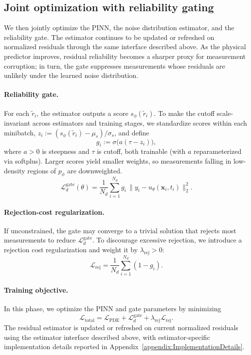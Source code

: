 \documentclass{article}
\theoremstyle{plain}
\theoremstyle{definition}
\theoremstyle{remark}
\begin{document}
\subsection{Joint optimization with reliability gating}
\label{subsec:stage2}
We then jointly optimize the PINN, the noise distribution estimator, and the reliability gate. The estimator continues to be updated or refreshed on normalized residuals through the same interface described above. As the physical predictor improves, residual reliability becomes a sharper proxy for measurement corruption; in turn, the gate suppresses measurements whose residuals are unlikely under the learned noise distribution.

\paragraph{Reliability gate.}
For each $\tilde r_i$, the estimator outputs a score $s_\phi(\tilde r_i)$. To make the cutoff scale-invariant across estimators and training stages, we standardize scores within each minibatch, $z_i := (s_\phi(\tilde r_i) - \mu_s)/\sigma_s$, and define
\begin{equation}
g_i := \sigma\!\big(a(\tau - z_i)\big),
\label{eq:gate}
\end{equation}
where $a > 0$ is steepness and $\tau$ is cutoff, both trainable (with $a$ reparameterized via softplus). Larger scores yield smaller weights, so measurements falling in low-density regions of $p_\phi$ are downweighted.
\begin{equation}
\mathcal{L}_{d}^{\text{gate}}(\theta)
= \frac{1}{N_d}\sum_{i=1}^{N_d} g_i \, \|y_i - u_\theta(\mathbf{x}_i,t_i)\|_2^2.
\label{eq:gated_data}
\end{equation}

\paragraph{Rejection-cost regularization.}
If unconstrained, the gate may converge to a trivial solution that rejects most measurements to reduce $\mathcal{L}_{d}^{\text{gate}}$. To discourage excessive rejection, we introduce a rejection cost regularization and weight it by $\lambda_{\text{rej}}>0$:
\begin{equation}
\mathcal{L}_{\text{rej}}
= \frac{1}{N_d}\sum_{i=1}^{N_d} (1-g_i).
\label{eq:rej_cost}
\end{equation}

\paragraph{Training objective.}
In this phase, we optimize the PINN and gate parameters by minimizing
\begin{equation}
\mathcal{L}_{\text{total}}
= \mathcal{L}_{\text{PDE}}
+ \mathcal{L}_{d}^{\text{gate}}
+ \lambda_{\text{rej}}\mathcal{L}_{\text{rej}}.
\label{eq:joint_pinn_gate}
\end{equation}
The residual estimator is updated or refreshed on current normalized residuals using the estimator interface described above, with estimator-specific implementation details reported in Appendix~\ref{appendix:ImplementationDetails}.
\end{document}
